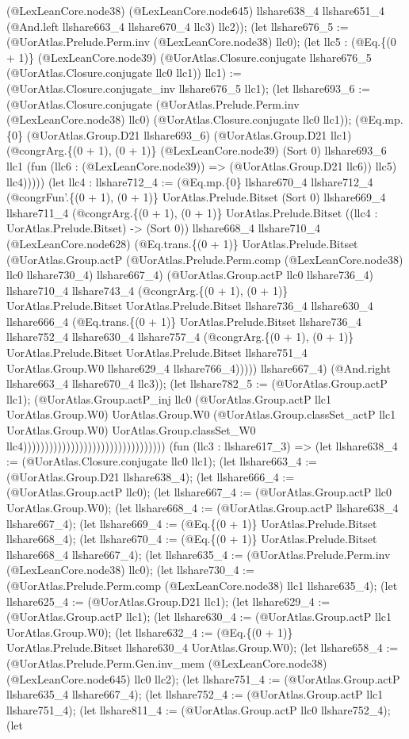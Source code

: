 \documentclass[11pt]{article}
\begin{document}
(@LexLeanCore.node38) (@LexLeanCore.node645) llshare638\_4 llshare651\_4 (@And.left llshare663\_4 llshare670\_4 llc3) llc2)); (let llshare676\_5 := (@UorAtlas.Prelude.Perm.inv (@LexLeanCore.node38) llc0); (let llc5 : (@Eq.\{(0 + 1)\} (@LexLeanCore.node39) (@UorAtlas.Closure.conjugate llshare676\_5 (@UorAtlas.Closure.conjugate llc0 llc1)) llc1) := (@UorAtlas.Closure.conjugate\_inv llshare676\_5 llc1); (let llshare693\_6 := (@UorAtlas.Closure.conjugate (@UorAtlas.Prelude.Perm.inv (@LexLeanCore.node38) llc0) (@UorAtlas.Closure.conjugate llc0 llc1)); (@Eq.mp.\{0\} (@UorAtlas.Group.D21 llshare693\_6) (@UorAtlas.Group.D21 llc1) (@congrArg.\{(0 + 1), (0 + 1)\} (@LexLeanCore.node39) (Sort 0) llshare693\_6 llc1 (fun (llc6 : (@LexLeanCore.node39)) => (@UorAtlas.Group.D21 llc6)) llc5) llc4))))) (let llc4 : llshare712\_4 := (@Eq.mp.\{0\} llshare670\_4 llshare712\_4 (@congrFun'.\{(0 + 1), (0 + 1)\} UorAtlas.Prelude.Bitset (Sort 0) llshare669\_4 llshare711\_4 (@congrArg.\{(0 + 1), (0 + 1)\} UorAtlas.Prelude.Bitset ((llc4 : UorAtlas.Prelude.Bitset) -> (Sort 0)) llshare668\_4 llshare710\_4 (@LexLeanCore.node628) (@Eq.trans.\{(0 + 1)\} UorAtlas.Prelude.Bitset (@UorAtlas.Group.actP (@UorAtlas.Prelude.Perm.comp (@LexLeanCore.node38) llc0 llshare730\_4) llshare667\_4) (@UorAtlas.Group.actP llc0 llshare736\_4) llshare710\_4 llshare743\_4 (@congrArg.\{(0 + 1), (0 + 1)\} UorAtlas.Prelude.Bitset UorAtlas.Prelude.Bitset llshare736\_4 llshare630\_4 llshare666\_4 (@Eq.trans.\{(0 + 1)\} UorAtlas.Prelude.Bitset llshare736\_4 llshare752\_4 llshare630\_4 llshare757\_4 (@congrArg.\{(0 + 1), (0 + 1)\} UorAtlas.Prelude.Bitset UorAtlas.Prelude.Bitset llshare751\_4 UorAtlas.Group.W0 llshare629\_4 llshare766\_4))))) llshare667\_4) (@And.right llshare663\_4 llshare670\_4 llc3)); (let llshare782\_5 := (@UorAtlas.Group.actP llc1); (@UorAtlas.Group.actP\_inj llc0 (@UorAtlas.Group.actP llc1 UorAtlas.Group.W0) UorAtlas.Group.W0 (@UorAtlas.Group.classSet\_actP llc1 UorAtlas.Group.W0) UorAtlas.Group.classSet\_W0 llc4))))))))))))))))))))))))))))))))) (fun (llc3 : llshare617\_3) => (let llshare638\_4 := (@UorAtlas.Closure.conjugate llc0 llc1); (let llshare663\_4 := (@UorAtlas.Group.D21 llshare638\_4); (let llshare666\_4 := (@UorAtlas.Group.actP llc0); (let llshare667\_4 := (@UorAtlas.Group.actP llc0 UorAtlas.Group.W0); (let llshare668\_4 := (@UorAtlas.Group.actP llshare638\_4 llshare667\_4); (let llshare669\_4 := (@Eq.\{(0 + 1)\} UorAtlas.Prelude.Bitset llshare668\_4); (let llshare670\_4 := (@Eq.\{(0 + 1)\} UorAtlas.Prelude.Bitset llshare668\_4 llshare667\_4); (let llshare635\_4 := (@UorAtlas.Prelude.Perm.inv (@LexLeanCore.node38) llc0); (let llshare730\_4 := (@UorAtlas.Prelude.Perm.comp (@LexLeanCore.node38) llc1 llshare635\_4); (let llshare625\_4 := (@UorAtlas.Group.D21 llc1); (let llshare629\_4 := (@UorAtlas.Group.actP llc1); (let llshare630\_4 := (@UorAtlas.Group.actP llc1 UorAtlas.Group.W0); (let llshare632\_4 := (@Eq.\{(0 + 1)\} UorAtlas.Prelude.Bitset llshare630\_4 UorAtlas.Group.W0); (let llshare658\_4 := (@UorAtlas.Prelude.Perm.Gen.inv\_mem (@LexLeanCore.node38) (@LexLeanCore.node645) llc0 llc2); (let llshare751\_4 := (@UorAtlas.Group.actP llshare635\_4 llshare667\_4); (let llshare752\_4 := (@UorAtlas.Group.actP llc1 llshare751\_4); (let llshare811\_4 := (@UorAtlas.Group.actP llc0 llshare752\_4); (let 
\end{document}

